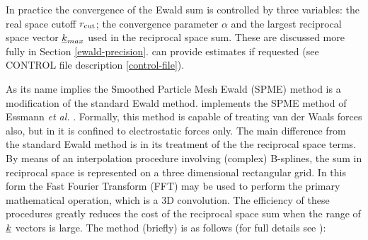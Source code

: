 In practice the convergence of the Ewald sum is controlled by
three variables: the real space cutoff $r_{\rm cut}$; the convergence
parameter $\alpha$ and the largest reciprocal space vector
$\mbox{$\underline{k}$}_{max}$ used in the reciprocal space sum.  These are
discussed more fully in Section \ref{ewald-precision}.  \D can
provide estimates if requested (see CONTROL file description
\ref{control-file}).

As its name implies the Smoothed Particle Mesh Ewald (SPME)
 method is a modification of the standard Ewald
method.  \D implements the SPME method of Essmann {\em et al.}
\cite{essmann-95a}.  Formally, this method is capable of treating
van der Waals forces also, but in \D it is confined to
electrostatic forces only.  The main difference from the standard
Ewald method is in its treatment of the the reciprocal space
terms.  By means of an interpolation procedure involving (complex)
B-splines, the sum in reciprocal space is represented on a three
dimensional rectangular grid.  In this form the Fast Fourier
Transform (FFT) may be used to perform the primary mathematical
operation, which is a 3D convolution.  The efficiency of these
procedures greatly reduces the cost of the reciprocal space sum
when the range of $\mbox{$\underline{k}$}$ vectors is large.  The method
(briefly) is as follows (for full details see \cite{essmann-95a}):

